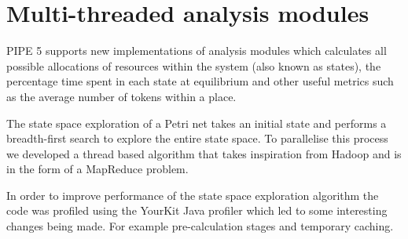 \section{Multi-threaded analysis modules}
PIPE 5 supports new implementations of analysis modules which calculates all possible allocations of resources within the system (also known as states), the percentage time spent in each state at equilibrium and other useful metrics such as the average number of tokens within a place. 

The state space exploration of a Petri net takes an initial state and performs a breadth-first search to explore the entire state space. To parallelise this process we developed a thread based algorithm that takes inspiration from Hadoop and is in the form of a MapReduce problem. 

In order to improve performance of the state space exploration algorithm the code was profiled using the YourKit Java profiler which led to some interesting changes being made. For example pre-calculation stages and temporary caching.










